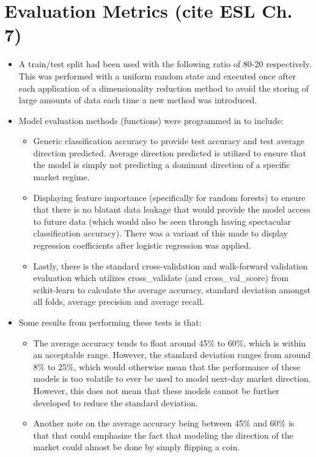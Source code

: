 \documentclass[11pt]{article}
\begin{document}
\section{Evaluation Metrics (cite ESL Ch. 7)}
\begin{itemize}
    \item A train/test split had been used with the following ratio of 80-20 respectively. This was performed with a uniform random state and executed once after each application of a dimensionality reduction method to avoid the storing of large amounts of data each time a new method was introduced.
    \item Model evaluation methods (functions) were programmed in to include:
    \begin{itemize}
        \item Generic classification accuracy to provide test accuracy and test average direction predicted. Average direction predicted is utilized to ensure that the model is simply not predicting a dominant direction of a specific market regime.
        \item Displaying feature importance (specifically for random forests) to ensure that there is no blatant data leakage that would provide the model access to future data (which would also be seen through having spectacular classification accuracy). There was a variant of this made to display regression coefficients after logistic regression was applied.
        \item Lastly, there is the standard cross-validation and walk-forward validation evaluation which utilizes cross\_validate (and cross\_val\_score) from scikit-learn to calculate the average accuracy, standard deviation amongst all folds, average precision and average recall.
    \end{itemize}
    \item Some results from performing these tests is that:
    \begin{itemize}
        \item The average accuracy tends to float around 45\% to 60\%, which is within an acceptable range. However, the standard deviation ranges from around 8\% to 25\%, which would otherwise mean that the performance of these models is too volatile to ever be used to model next-day market direction. However, this does not mean that these models cannot be further developed to reduce the standard deviation. 
        \item Another note on the average accuracy being between 45\% and 60\% is that that could emphasize the fact that modeling the direction of the market could almost be done by simply flipping a coin.
    \end{itemize}
\end{itemize}
\end{document}
